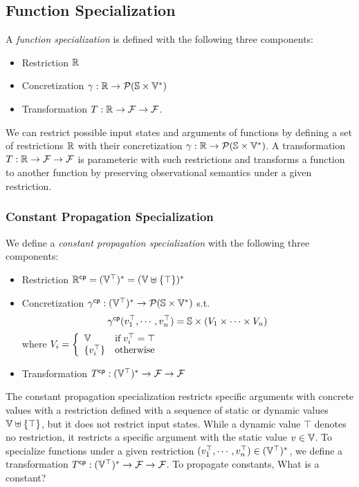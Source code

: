 \subsection{Function Specialization}

A \textit{function specialization} is defined with the following three
components:
\begin{itemize}
  \item Restriction $\mathbb{R}$
  \item Concretization $\gamma: \mathbb{R} \rightarrow \mathcal{P}(\mathbb{S}
    \times \mathbb{V}^*)$
  \item Transformation $T: \mathbb{R} \rightarrow \mathcal{F}
    \rightarrow \mathcal{F}$.
\end{itemize}
We can restrict possible input states and arguments of functions by defining a
set of restrictions $\mathbb{R}$ with their concretization $\gamma:
\mathbb{R} \rightarrow \mathcal{P}(\mathbb{S} \times \mathbb{V}^*)$. A transformation
$T: \mathbb{R} \rightarrow \mathcal{F} \rightarrow \mathcal{F}$ is
parameteric with such restrictions and transforms a function to another function
by preserving observational semantics under a given restriction.


\subsubsection{Constant Propagation Specialization}
We define a \textit{constant propagation specialization} with the following
three components:

\begin{itemize}
  \item Restriction $\mathbb{R}^{\textsf{cp}} = (\mathbb{V}^\top)^* =
    (\mathbb{V} \uplus \{ \top \})^*$
  \item Concretization $\gamma^{\textsf{cp}}: (\mathbb{V}^\top)^* \rightarrow \mathcal{P}(\mathbb{S}
    \times \mathbb{V}^*)$ s.t.
    \[
      \gamma^{\textsf{cp}}(v^\top_1, \cdots, v^\top_n) = \mathbb{S} \times (V_1 \times \cdots
      \times V_n)
    \]
    where $V_i = \left\{
      \begin{array}{ll}
        \mathbb{V} & \text{if} \; v^\top_i = \top\\
        \{ v^\top_i \} & \text{otherwise}\\
      \end{array}
    \right.$
  \item Transformation $T^{\textsf{cp}}: (\mathbb{V}^\top)^* \rightarrow \mathcal{F}
    \rightarrow \mathcal{F}$
\end{itemize}
The constant propagation specialization restricts specific arguments with
concrete values with a restriction defined with a sequence of static or dynamic
values $\mathbb{V} \uplus \{ \top \}$, but it does not restrict input states.
While a dynamic value $\top$ denotes no restriction, it restricts a specific
argument with the static value $v \in \mathbb{V}$. To specialize functions under
a given restriction $(v^\top_1, \cdots, v^\top_n) \in (\mathbb{V}^\top)^*$, we
define a transformation $T^{\textsf{cp}}: (\mathbb{V}^\top)^* \rightarrow \mathcal{F}
\rightarrow \mathcal{F}$. To propagate constants, \todo What is a constant?

